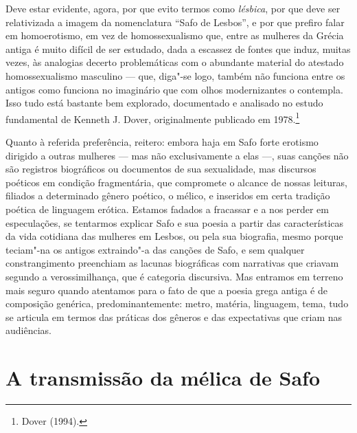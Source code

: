 Deve estar evidente, agora, por que evito termos como
\textit{lésbica}, por que deve ser relativizada a imagem da nomenclatura “Safo
de Lesbos”, e por que prefiro falar em homoerotismo, em vez de homossexualismo
que, entre as mulheres da Grécia antiga é muito difícil de ser estudado, dada a
escassez de fontes que induz, muitas vezes, às analogias decerto problemáticas
com o abundante material do atestado homossexualismo masculino --- que,
diga"-se logo, também não funciona entre os antigos como funciona no imaginário
que com olhos modernizantes o contempla. Isso tudo está bastante
bem explorado, documentado e analisado no estudo fundamental de Kenneth J.
Dover, originalmente publicado em 1978.\footnote{ Dover (1994).}

Quanto à referida preferência, reitero: embora haja em Safo forte erotismo
dirigido a outras mulheres --- mas não exclusivamente a elas ---, suas canções não
são registros biográficos ou documentos de sua sexualidade, mas discursos
poéticos em condição fragmentária, que compromete o alcance de nossas leituras,
filiados a determinado gênero poético, o mélico, e inseridos em certa tradição
poética de linguagem erótica. Estamos fadados a fracassar e a nos perder em
especulações, se tentarmos explicar Safo e sua poesia a partir das
características da vida cotidiana das mulheres em Lesbos, ou pela sua
biografia, mesmo porque teciam"-na os antigos extraindo"-a das canções de Safo, e
sem qualquer constrangimento preenchiam as lacunas biográficas com narrativas
que criavam segundo a verossimilhança, que é categoria discursiva. Mas entramos em terreno mais seguro
quando atentamos para o fato de que a poesia grega antiga é de composição
genérica, predominantemente: metro, matéria, linguagem, tema, tudo se articula
em termos das práticas dos gêneros e das expectativas que criam nas audiências.



\section{A transmissão da mélica de Safo}

